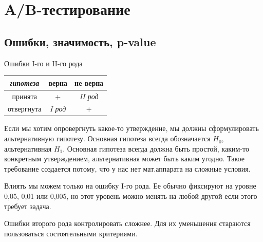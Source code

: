 \documentclass[../handbook.tex]{subfiles}
\begin{document}
\chapter{A\slash B-тестирование}


\section{Ошибки, значимость, p-value}

\begin{margintable}
    \caption{Ошибки I-го и II-го рода}
    \label{tab:mistakes}
    \begin{center}
        \begin{tabular}[c]{c|c c}
            {\it гипотеза} & верна & не верна \\
            \hline
            принята & + & {\it II род} \\
            отвергнута & {\it I род} & + \\
        \end{tabular}
    \end{center}
\end{margintable}

Если мы хотим опровергнуть какое-то утверждение, мы должны сформулировать
альтернативную гипотезу. Основная гипотеза всегда обозначается $H_0$,
альтернативная $H_1$. Основная гипотеза всегда должна быть простой, каким-то
конкретным утверждением, альтернативная может быть каким угодно. Такое
требование создается потому, что у нас нет мат.аппарата на сложные условия.

Влиять мы можем только на ошибку I-го рода. Ее обычно фиксируют на уровне 0,05,
0,01 или 0,005, но этот уровень можно менять на любой другой если этого требует
задача.

Ошибки второго рода контролировать сложнее. Для их уменьшения стараются
пользоваться состоятельными критериями.
\end{document}
